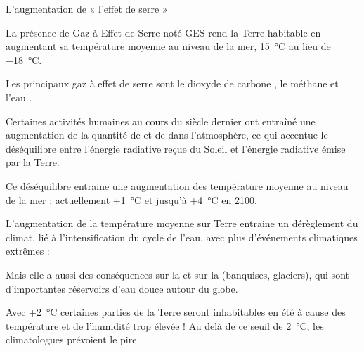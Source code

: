 \begin{doc}{L'augmentation de « l'effet de serre »}
  
  La présence de Gaz à Effet de Serre noté GES rend la Terre habitable en augmentant sa température moyenne au niveau de la mer, \qty{15}{\degreeCelsius} au lieu de \qty{-18}{\degreeCelsius}.

  \begin{importants}  
    Les principaux gaz à effet de serre sont le dioxyde de carbone \dioxydeDeCarbone,
    le méthane \methane et l'eau \eau.
  \end{importants}

  Certaines activités humaines au cours du siècle dernier ont entraîné une augmentation de la quantité de \dioxydeDeCarbone et de \methane dans l'atmosphère, ce qui accentue le déséquilibre entre l'énergie radiative reçue du Soleil et l'énergie radiative émise par la Terre.

  Ce déséquilibre entraine une augmentation des température moyenne au niveau de la mer : actuellement +\qty{1}{\degreeCelsius} et jusqu'à +\qty{4}{\degreeCelsius} en 2100.

  \begin{importants}
    L'augmentation de la température moyenne sur Terre entraine un dérèglement du climat, lié à l'intensification du cycle de l'eau, avec plus d'événements climatiques extrêmes : 
  \end{importants}
  \begin{importants}
    Mais elle a aussi des conséquences sur la  et sur la  (banquises, glaciers), qui sont d'importantes réservoirs d'eau douce autour du globe.
  \end{importants}

  Avec +\qty{2}{\degreeCelsius} certaines parties de la Terre seront inhabitables en été à cause des température et de l'humidité trop élevée ! 
  Au delà de ce seuil de \qty{2}{\degreeCelsius}, les climatologues prévoient le pire.
\end{doc}


